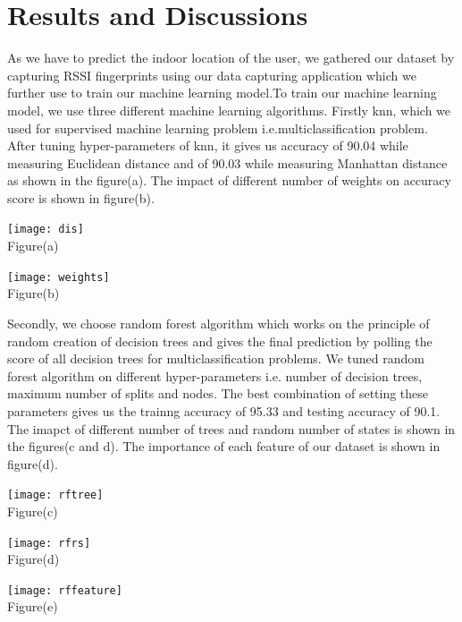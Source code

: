 
\chapter{Results and Discussions} %
\label{Chapter5}

As we have  to predict the indoor location of the user, we gathered our dataset by capturing RSSI fingerprints using our data capturing application which we further use to train our machine learning model.To train our machine learning model, we use three different machine learning algorithms. Firstly knn, which we used for supervised machine learning problem i.e.multiclassification problem. After tuning hyper-parameters of knn, it gives us accuracy of 90.04 while measuring Euclidean distance and of 90.03 while measuring Manhattan distance as shown in the figure(a). The impact of different number of weights on accuracy score is shown in figure(b).

\begin{center}
\texttt{[image: dis]}
\\Figure(a)
\end{center}

\begin{center}
\texttt{[image: weights]}
\\Figure(b)
\end{center}

Secondly, we choose random forest algorithm which works on the principle of random creation of decision trees and gives the final prediction by polling the score of all decision trees for multiclassification problems. We tuned random forest algorithm on different hyper-parameters i.e. number of decision trees, maximum number of splits and nodes. The best combination of setting these parameters gives us the trainng accuracy of 95.33 and testing accuracy of 90.1. The imapct of different number of trees and random number of states is shown in the figures(c and d). The importance of each feature of our dataset is shown in figure(d).


\begin{center}
\texttt{[image: rftree]}
\\Figure(c)
\end{center}

\begin{center}
\texttt{[image: rfrs]}
\\Figure(d)
\end{center}
\begin{center}
\texttt{[image: rffeature]}
\\Figure(e)
\end{center}

